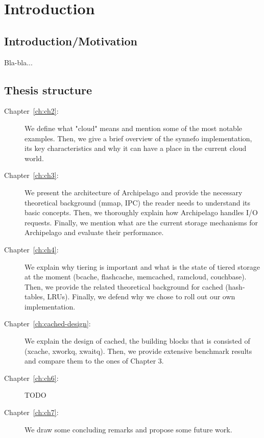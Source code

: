 \chapter{Introduction}\label{ch:intro}

\section{Introduction/Motivation}

Bla-bla...

\section{Thesis structure}

\begin{description}
\item[Chapter~\ref{ch:ch2}:]
We define what "cloud" means and mention some of the most notable examples.
Then, we give a brief overview of the synnefo implementation, its key
characteristics and why it can have a place in the current cloud world.
\item[Chapter~\ref{ch:ch3}:]
We present the architecture of Archipelago and provide the necessary theoretical
background (mmap, IPC) the reader needs to understand its basic concepts. Then,
we thoroughly explain how Archipelago handles I/O requests. Finally, we mention
what are the current storage mechanisms for Archipelago and evaluate their
performance.
\item[Chapter~\ref{ch:ch4}:]
We explain why tiering is important and what is the state of tiered storage at
the moment (bcache, flashcache, memcached, ramcloud, couchbase).  Then, we
provide the related theoretical background for cached (hash-tables, LRUs).
Finally, we defend why we chose to roll out our own implementation.
\item[Chapter~\ref{ch:cached-design}:]
We explain the design of cached, the building blocks that is consisted of
(xcache, xworkq, xwaitq). Then, we provide extensive benchmark results and
compare them to the ones of Chapter 3.
\item[Chapter~\ref{ch:ch6}:]
TODO
\item[Chapter~\ref{ch:ch7}:]
We draw some concluding remarks and propose some future work.
\end{description}
